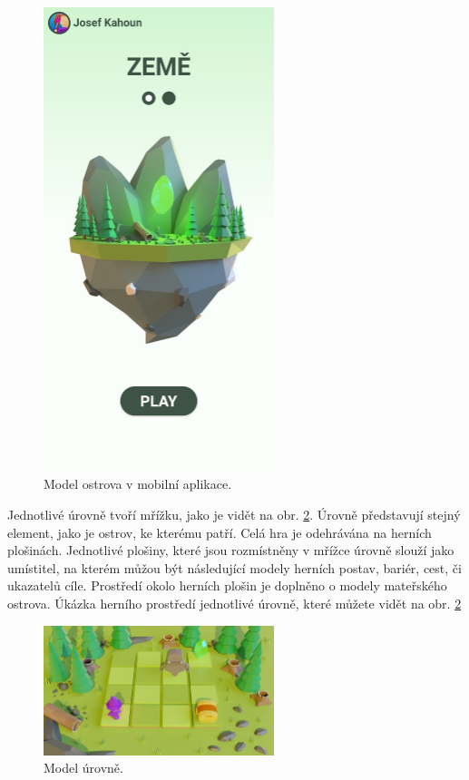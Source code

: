 \begin{figure}[h]
    \centering
    \includegraphics[width=0.6\textwidth]{img/mobilni-aplikace-ostrov.jpg}
    \caption{Model ostrova v mobilní aplikace.}
    \label{fig:mobilni-aplikace-ostrov}
\end{figure}

Jednotlivé úrovně tvoří mřížku, jako je vidět na obr. \ref{fig:model-levelu}. Úrovně představují stejný element, jako je ostrov, ke kterému patří. Celá hra je odehrávána na herních plošinách. Jednotlivé plošiny, které jsou rozmístněny v mřížce úrovně slouží jako umístitel, na kterém můžou být následující modely herních postav, bariér, cest, či ukazatelů cíle. Prostředí okolo herních plošin je doplněno o modely mateřského ostrova. Úkázka herního prostředí jednotlivé úrovně, které můžete vidět na obr. \ref{fig:model-levelu}

\begin{figure}[h]
    \centering
    \includegraphics[width=0.6\textwidth]{img/model-levelu.png}
    \caption{Model úrovně.}
    \label{fig:model-levelu}
\end{figure}